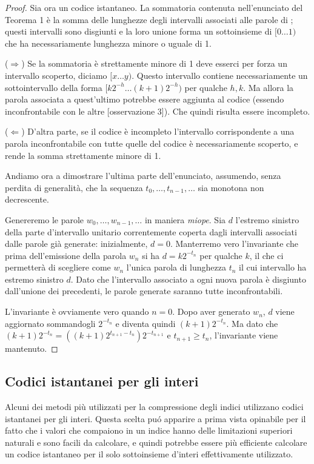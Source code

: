 \begin{proof}
    Sia ora  un codice istantaneo. La sommatoria contenuta nell'enunciato del Teorema 1 è la somma delle lunghezze degli intervalli associati alle parole di ; questi intervalli sono disgiunti e la loro unione forma un sottoinsieme di $[0\dots1)$ che ha necessariamente lunghezza minore o uguale di 1.

    ($\Longrightarrow$) Se la sommatoria è strettamente minore di 1 deve esserci per forza un intervallo scoperto, diciamo $[x \dots y)$. Questo intervallo contiene necessariamente un sottointervallo della forma $[k2^{-h} \dots (k + 1)2^{-h})$ per qualche $h, k$. Ma allora la parola associata a quest'ultimo potrebbe essere aggiunta al codice (essendo inconfrontabile con le altre [osservazione 3]). Che quindi risulta essere incompleto.

    ($\Longleftarrow$) D'altra parte, se il codice è incompleto l'intervallo corrispondente a una parola inconfrontabile con tutte quelle del codice è necessariamente scoperto, e rende la somma strettamente minore di 1.

    Andiamo ora a dimostrare l'ultima parte dell'enunciato, assumendo, senza perdita di generalità, che la sequenza $t_0, \dots, t_{n - 1}, \dots$ sia monotona non decrescente.

    Genereremo le parole  $w_0, \dots, w_{n - 1}, \dots$ in maniera \textit{miope}. Sia $d$ l'estremo sinistro della parte d'intervallo unitario correntemente coperta dagli intervalli associati dalle parole già generate: inizialmente, $d = 0$. Manterremo vero l'invariante che prima dell'emissione della parola $w_n$ si ha $d = k2^{-t_n}$ per qualche $k$, il che ci permetterà di scegliere come $w_n$ l'unica parola di lunghezza $t_n$ il cui intervallo ha estremo sinistro $d$. Dato che l'intervallo associato a ogni nuova parola è disgiunto dall'unione dei precedenti, le parole generate saranno tutte inconfrontabili.

    L'invariante è ovviamente vero quando $n = 0$. Dopo aver generato $w_n$, $d$ viene aggiornato sommandogli $2^{-t_n}$ e diventa quindi $(k + 1)2^{-t_n}$. Ma dato che $(k + 1)2^{-t_n} = ((k + 1)2^{t_{n + 1}-t_n})2^{-t_{n + 1}}$ e $t_{n + 1} \geq t_n$, l'invariante viene mantenuto.
    \qedhere
\end{proof}
\subsection{Codici istantanei per gli interi}
Alcuni dei metodi più utilizzati per la compressione degli indici utilizzano codici istantanei per gli interi. Questa scelta puó apparire a prima vista opinabile per il fatto che i valori che compaiono in un indice hanno delle limitazioni superiori naturali e sono facili da calcolare, e quindi potrebbe essere più efficiente calcolare un codice istantaneo per il solo sottoinsieme d'interi effettivamente utilizzato.

